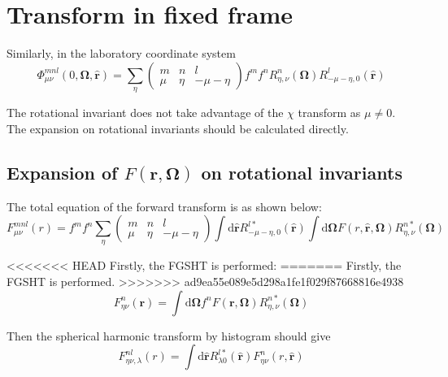 \section{Transform in fixed frame}

Similarly, in the laboratory coordinate system
\begin{equation}
\Phi_{\mu\nu}^{mnl}(0,\mathbf{\Omega},\mathbf{\hat{r}})=\sum_{\eta}\left(\begin{array}{ccc}
m & n & l\\
\mu & \eta & -\mu-\eta
\end{array}\right)f^{m}f^{n}R_{\eta,\nu}^{n}(\mathbf{\Omega})R_{-\mu-\eta,0}^{l}(\mathbf{\hat{r}})\label{eq:phi_global}
\end{equation}


The rotational invariant does not take advantage of the $\chi$ transform
as $\mu\neq0$. The expansion on rotational invariants should be calculated
directly.


\subsection{Expansion of $F(\mathbf{r},\mathbf{\Omega})$ on rotational invariants}

The total equation of the forward transform is as shown below:
\begin{equation}
F_{\mu\nu}^{mnl}(r)=f^{m}f^{n}\sum_{\eta}\left(\begin{array}{ccc}
m & n & l\\
\mu & \eta & -\mu-\eta
\end{array}\right)\int\mathrm{d}\hat{\mathbf{r}}R_{-\mu-\eta,0}^{l*}(\mathbf{\hat{r}})\int\mathrm{d}\mathbf{\Omega}F(r,\hat{\mathbf{r}},\mathbf{\Omega})R_{\eta,\nu}^{n*}(\mathbf{\Omega})
\end{equation}


<<<<<<< HEAD
Firstly, the FGSHT is performed:
=======
Firstly, the FGSHT is performed.
>>>>>>> ad9ea55e089e5d298a1fe1f029f87668816e4938
\begin{equation}
F_{\eta\nu}^{n}(\mathbf{r})=\int\mathrm{d}\mathbf{\Omega}f^{n}F(\mathbf{r},\mathbf{\Omega})R_{\eta,\nu}^{n*}(\mathbf{\Omega})
\end{equation}


Then the spherical harmonic transform by histogram should give
\begin{equation}
F_{\eta\nu,\lambda}^{nl}(r)=\int\mathrm{d}\hat{\mathbf{r}}R_{\lambda0}^{l*}(\mathbf{\hat{r}})F_{\eta\nu}^{n}(r,\mathbf{\hat{r}})\label{eq:sht-1}
\end{equation}


